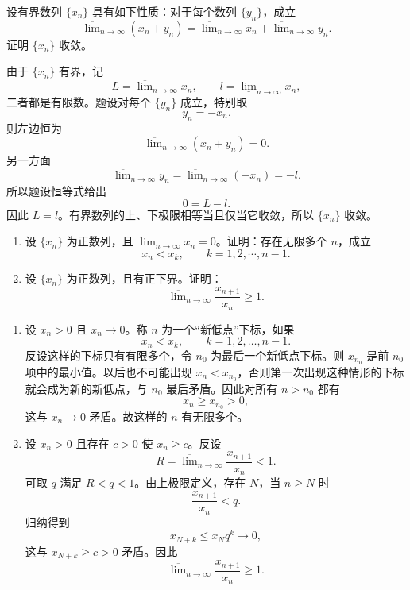 \begin{xreferenceproblem}[5]
设有界数列 $\{x_n\}$ 具有如下性质：对于每个数列 $\{y_n\}$，成立
  \[
    \overline{\lim}_{n\to\infty}(x_n+y_n)
    =\overline{\lim}_{n\to\infty}x_n+\overline{\lim}_{n\to\infty}y_n.
  \]
  证明 $\{x_n\}$ 收敛。
\end{xreferenceproblem}
\begin{xsolution}
由于 $\{x_n\}$ 有界，记
\[
  L=\overline{\lim}_{n\to\infty}x_n,
  \qquad
  l=\underline{\lim}_{n\to\infty}x_n,
\]
二者都是有限数。题设对每个 $\{y_n\}$ 成立，特别取
\[
  y_n=-x_n.
\]
则左边恒为
\[
  \overline{\lim}_{n\to\infty}(x_n+y_n)=0.
\]
另一方面
\[
  \overline{\lim}_{n\to\infty}y_n
  =\overline{\lim}_{n\to\infty}(-x_n)=-l.
\]
所以题设恒等式给出
\[
  0=L-l.
\]
因此 $L=l$。有界数列的上、下极限相等当且仅当它收敛，所以 $\{x_n\}$ 收敛。
\end{xsolution}


\begin{xreferenceproblem}[6]
\begin{enumerate}[label=(\arabic*)]
    \item 设 $\{x_n\}$ 为正数列，且 $\lim_{n\to\infty}x_n=0$。证明：存在无限多个 $n$，成立
    \[
      x_n<x_k,\qquad k=1,2,\cdots,n-1.
    \]
    \item 设 $\{x_n\}$ 为正数列，且有正下界。证明：
    \[
      \overline{\lim}_{n\to\infty}\frac{x_{n+1}}{x_n}\geqslant1.
    \]
  \end{enumerate}
\end{xreferenceproblem}
\begin{xsolution}
\begin{enumerate}[label=(\arabic*)]
  \item 设 $x_n>0$ 且 $x_n\to0$。称 $n$ 为一个“新低点”下标，如果
  \[
    x_n<x_k,\qquad k=1,2,\ldots,n-1.
  \]
  反设这样的下标只有有限多个，令 $n_0$ 为最后一个新低点下标。则 $x_{n_0}$ 是前 $n_0$ 项中的最小值。以后也不可能出现 $x_n<x_{n_0}$，否则第一次出现这种情形的下标就会成为新的新低点，与 $n_0$ 最后矛盾。因此对所有 $n>n_0$ 都有
  \[
    x_n\geqslant x_{n_0}>0,
  \]
  这与 $x_n\to0$ 矛盾。故这样的 $n$ 有无限多个。

  \item 设 $x_n>0$ 且存在 $c>0$ 使 $x_n\geqslant c$。反设
  \[
    R=\overline{\lim}_{n\to\infty}\frac{x_{n+1}}{x_n}<1.
  \]
  可取 $q$ 满足 $R<q<1$。由上极限定义，存在 $N$，当 $n\geqslant N$ 时
  \[
    \frac{x_{n+1}}{x_n}<q.
  \]
  归纳得到
  \[
    x_{N+k}\leqslant x_Nq^k\to0,
  \]
  这与 $x_{N+k}\geqslant c>0$ 矛盾。因此
  \[
    \overline{\lim}_{n\to\infty}\frac{x_{n+1}}{x_n}\geqslant1.
  \]
\end{enumerate}
\end{xsolution}


